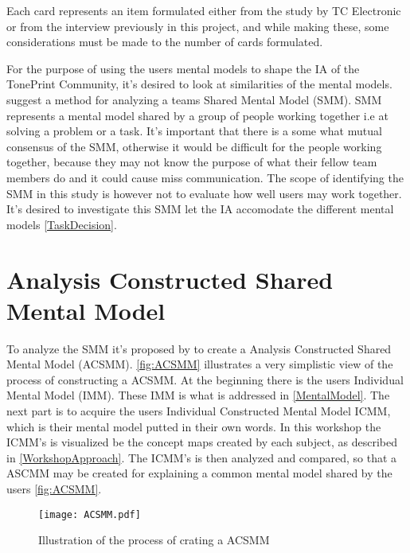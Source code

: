 Each card represents an item formulated either from the study by TC Electronic or from the interview previously in this project, and while making these, some considerations must be made to the number of cards formulated. 








For the purpose of using the users mental models to shape the IA of the TonePrint Community, it's desired to look at similarities of the mental models. \textcite{WEB:ConceptMapAnalysis} suggest a method for analyzing a teams Shared Mental Model (SMM). SMM represents a mental model shared by a group of people working together i.e  at solving a problem or a task. It's important that there is a some what mutual consensus of the SMM, otherwise it would be difficult for the people working together, because they may not know the purpose of what their fellow team members do and it could cause miss communication. The scope of identifying the SMM in this study is however not to evaluate how well users may work together. It's desired to investigate this SMM let the IA accomodate the different mental models \autoref{TaskDecision}.


\section{Analysis Constructed Shared Mental Model}
\label{ACSMM}
To analyze the SMM it's proposed by \textcite{WEB:ConceptMapAnalysis} to create a Analysis Constructed Shared Mental Model (ACSMM). \autoref{fig:ACSMM} illustrates a very simplistic view of the process of constructing a ACSMM. At the beginning there is the users Individual Mental Model (IMM). These IMM is what is addressed in \autoref{MentalModel}. The next part is to acquire the users Individual Constructed Mental Model ICMM, which is their mental model putted in their own words. In this workshop the ICMM's is visualized be the concept maps created by each subject, as described in \autoref{WorkshopApproach}. The ICMM's is then analyzed and compared, so that a ASCMM may be created for explaining a common mental model shared by the users \autoref{fig:ACSMM}.  

\begin{figure}[H]
	\centering
	\texttt{[image: ACSMM.pdf]}
	\caption{Illustration of the process of crating a ACSMM}
	\label{fig:ACSMM}
\end{figure}

